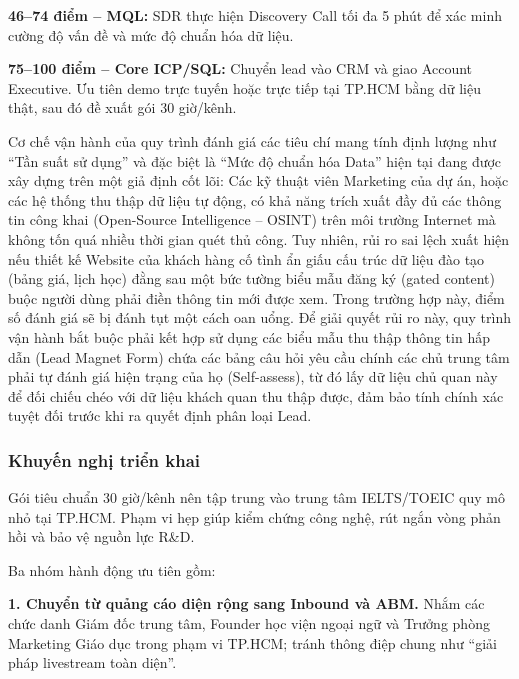 \textbf{46--74 điểm -- MQL:} SDR thực hiện Discovery Call tối đa 5 phút để xác minh cường độ vấn đề và mức độ chuẩn hóa dữ liệu.

\textbf{75--100 điểm -- Core ICP/SQL:} Chuyển lead vào CRM và giao Account Executive. Ưu tiên demo trực tuyến hoặc trực tiếp tại TP.HCM bằng dữ liệu thật, sau đó đề xuất gói 30 giờ/kênh.

\begin{WarningBox}
Cơ chế vận hành của quy trình đánh giá các tiêu chí mang tính định lượng như ``Tần suất sử dụng'' và đặc biệt là ``Mức độ chuẩn hóa Data'' hiện tại đang được xây dựng trên một giả định cốt lõi: Các kỹ thuật viên Marketing của dự án, hoặc các hệ thống thu thập dữ liệu tự động, có khả năng trích xuất đầy đủ các thông tin công khai (Open-Source Intelligence -- OSINT) trên môi trường Internet mà không tốn quá nhiều thời gian quét thủ công. Tuy nhiên, rủi ro sai lệch xuất hiện nếu thiết kế Website của khách hàng cố tình ẩn giấu cấu trúc dữ liệu đào tạo (bảng giá, lịch học) đằng sau một bức tường biểu mẫu đăng ký (gated content) buộc người dùng phải điền thông tin mới được xem. Trong trường hợp này, điểm số đánh giá sẽ bị đánh tụt một cách oan uổng. Để giải quyết rủi ro này, quy trình vận hành bắt buộc phải kết hợp sử dụng các biểu mẫu thu thập thông tin hấp dẫn (Lead Magnet Form) chứa các bảng câu hỏi yêu cầu chính các chủ trung tâm phải tự đánh giá hiện trạng của họ (Self-assess), từ đó lấy dữ liệu chủ quan này để đối chiếu chéo với dữ liệu khách quan thu thập được, đảm bảo tính chính xác tuyệt đối trước khi ra quyết định phân loại Lead.
\end{WarningBox}

\subsubsection{Khuyến nghị triển khai}

Gói tiêu chuẩn 30 giờ/kênh nên tập trung vào trung tâm IELTS/TOEIC quy mô nhỏ tại TP.HCM. Phạm vi hẹp giúp kiểm chứng công nghệ, rút ngắn vòng phản hồi và bảo vệ nguồn lực R\&D.

Ba nhóm hành động ưu tiên gồm:

\textbf{1. Chuyển từ quảng cáo diện rộng sang Inbound và ABM.} Nhắm các chức danh Giám đốc trung tâm, Founder học viện ngoại ngữ và Trưởng phòng Marketing Giáo dục trong phạm vi TP.HCM; tránh thông điệp chung như ``giải pháp livestream toàn diện''.

